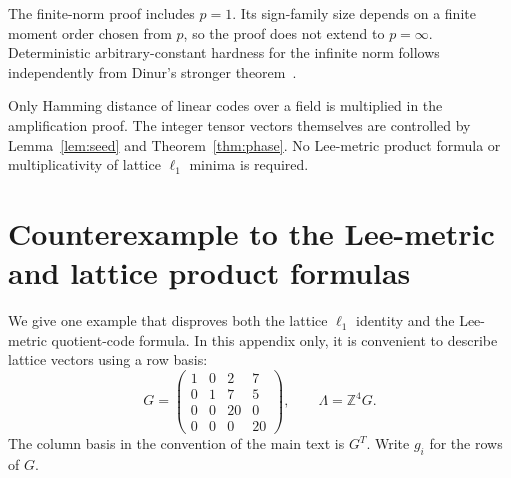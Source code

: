 \documentclass[11pt,letterpaper]{article}
\numberwithin{equation}{section}
\theoremstyle{definition}
\theoremstyle{remark}
\newcommand{\Z}{\mathbb Z}
\begin{document}
The finite-norm proof includes $p=1$. Its sign-family size depends on a finite moment order chosen from $p$, so the proof does not extend to $p=\infty$. Deterministic arbitrary-constant hardness for the infinite norm follows independently from Dinur's stronger theorem~\cite{dinur}.

Only Hamming distance of linear codes over a field is multiplied in the amplification proof. The integer tensor vectors themselves are controlled by Lemma~\ref{lem:seed} and Theorem~\ref{thm:phase}. No Lee-metric product formula or multiplicativity of lattice $\ell_1$ minima is required.

\appendix
\section{Counterexample to the Lee-metric and lattice product formulas}\label{app:counterexample}
We give one example that disproves both the lattice $\ell_1$ identity and the Lee-metric quotient-code formula. In this appendix only, it is convenient to describe lattice vectors using a row basis:
\begin{equation}\label{eq:counter-basis}
 G=\begin{pmatrix}
 1&0&2&7\\
 0&1&7&5\\
 0&0&20&0\\
 0&0&0&20
 \end{pmatrix},\qquad\Lambda=\Z^4G.
\end{equation}
The column basis in the convention of the main text is $G^T$. Write $g_i$ for the rows of $G$.
\end{document}
